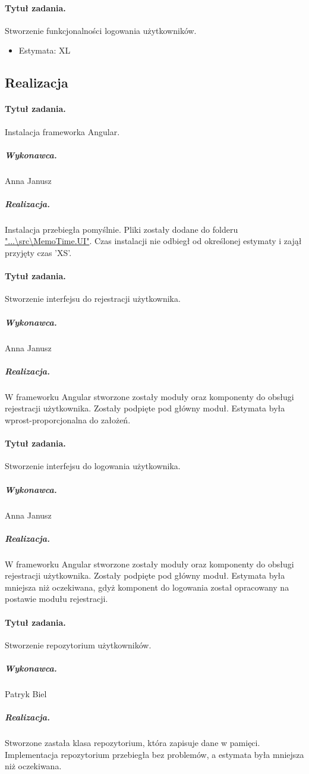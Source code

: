 ﻿\documentclass[a4paper]{article}
\begin{document}
\paragraph{Tytuł zadania.} Stworzenie funkcjonalności logowania użytkowników.
\begin{itemize}
\item Estymata: XL
\end{itemize}


\subsection{Realizacja}

\paragraph{Tytuł zadania.} Instalacja frameworka Angular.
\subparagraph{Wykonawca.} Anna Janusz
\subparagraph{Realizacja.} Instalacja przebiegła pomyślnie. Pliki zostały dodane do folderu \url{"...\src\MemoTime.UI"}. Czas instalacji nie odbiegł od określonej estymaty i zajął przyjęty czas 'XS'.


\paragraph{Tytuł zadania.} Stworzenie interfejsu do rejestracji użytkownika.
\subparagraph{Wykonawca.} Anna Janusz
\subparagraph{Realizacja.} W frameworku Angular stworzone zostały moduły oraz komponenty do obsługi rejestracji użytkownika. Zostały podpięte pod główny moduł. Estymata była wprost-proporcjonalna do założeń.


\paragraph{Tytuł zadania.} Stworzenie interfejsu do logowania użytkownika.
\subparagraph{Wykonawca.} Anna Janusz
\subparagraph{Realizacja.} W frameworku Angular stworzone zostały moduły oraz komponenty do obsługi rejestracji użytkownika. Zostały podpięte pod główny moduł. Estymata była mniejsza niż oczekiwana, gdyż komponent do logowania został opracowany na postawie modułu rejestracji.


\paragraph{Tytuł zadania.} Stworzenie repozytorium użytkowników.
\subparagraph{Wykonawca.} Patryk Biel
\subparagraph{Realizacja.} Stworzone zastała klasa repozytorium, która zapisuje dane w pamięci. Implementacja repozytorium przebiegła bez problemów, a estymata była mniejsza niż oczekiwana.
\end{document}
